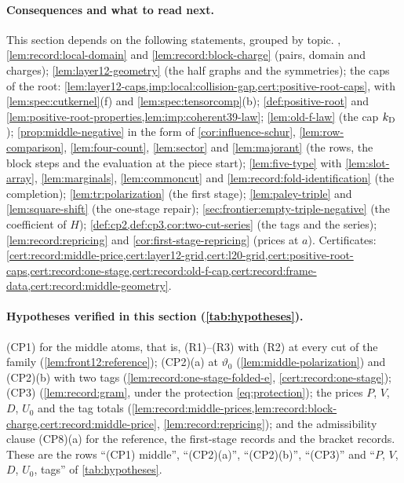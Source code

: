 \paragraph{Consequences and what to read next.}
This section depends on the following statements, grouped by topic.
, \cref{lem:record:local-domain} and
\cref{lem:record:block-charge} (pairs, domain and charges);
\cref{lem:layer12-geometry} (the half graphs and the symmetries); the caps of
the root: \cref{lem:layer12-caps,imp:local:collision-gap,cert:positive-root-caps}, with \cref{lem:spec:cutkernel}(f)
and \cref{lem:spec:tensorcomp}(b); \cref{def:positive-root} and
\cref{lem:positive-root-properties,lem:imp:coherent39-law}; \cref{lem:old-f-law} (the cap
$k_{\rm D}$); \cref{prop:middle-negative} in the form of
\cref{cor:influence-schur}, \cref{lem:row-comparison}, \cref{lem:four-count},
\cref{lem:sector} and \cref{lem:majorant} (the rows, the block steps and the
evaluation at the piece start); \cref{lem:five-type} with
\cref{lem:slot-array}, \cref{lem:marginals}, \cref{lem:commoncut} and
\cref{lem:record:fold-identification} (the completion);
\cref{lem:tr:polarization} (the first stage); \cref{lem:paley-triple} and
\cref{lem:square-shift} (the one-stage repair);
\cref{sec:frontier:empty-triple-negative} (the coefficient of $H$);
\cref{def:cp2,def:cp3,cor:two-cut-series} (the tags and the series);
\cref{lem:record:repricing} and \cref{cor:first-stage-repricing} (prices at
$a$). Certificates:
\cref{cert:record:middle-price,cert:layer12-grid,cert:l20-grid,cert:positive-root-caps,cert:record:one-stage,cert:record:old-f-cap,cert:record:frame-data,cert:record:middle-geometry}.

\paragraph{Hypotheses verified in this section (\cref{tab:hypotheses}).}
(CP1) for the middle atoms, that is, (R1)--(R3) with (R2) at every cut of the
family (\cref{lem:front12:reference}); (CP2)(a) at $\vartheta_0$
(\cref{lem:middle-polarization}) and (CP2)(b) with two tags
(\cref{lem:record:one-stage-folded-e}, \cref{cert:record:one-stage}); (CP3)
(\cref{lem:record:gram}, under the protection \eqref{eq:protection}); the
prices $P$, $V$, $D$, $U_0$ and the tag totals
(\cref{lem:record:middle-prices,lem:record:block-charge,cert:record:middle-price},
\cref{lem:record:repricing}); and the admissibility clause (CP8)(a) for the
reference, the first-stage records and the bracket records. These are the
rows ``(CP1) middle'', ``(CP2)(a)'', ``(CP2)(b)'', ``(CP3)'' and ``$P$,
$V$, $D$, $U_0$, tags'' of \cref{tab:hypotheses}.
